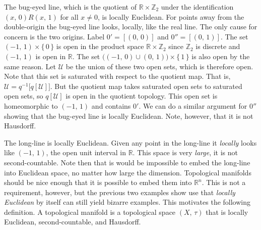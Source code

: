 \documentclass{article}
\theoremstyle{plain}
\theoremstyle{normal}
\newenvironment{example}{%
    \pushQED{\qed}\renewcommand{\qedsymbol}{$\blacksquare$}\examplex%
}{%
    \popQED\endexamplex%
}
\newenvironment{definition}{%
    \pushQED{\qed}\renewcommand{\qedsymbol}{$\blacksquare$}\definitionx%
}{%
    \popQED\enddefinitionx%
}
\begin{document}
        \begin{example}
            The bug-eyed line, which is the quotient of
            $\mathbb{R}\times\mathbb{Z}_{2}$ under the identification
            $(x,\,0)R(x,\,1)$ for all $x\ne{0}$, is locally Euclidean. For
            points away from the double-origin the bug-eyed line looks, locally,
            like the real line. The only cause for concern is the two origins.
            Label $0'=[(0,\,0)]$ and $0''=[(0,\,1)]$. The set
            $(-1,\,1)\times\{\,0\,\}$ is open in the product space
            $\mathbb{R}\times\mathbb{Z}_{2}$ since $\mathbb{Z}_{2}$ is discrete
            and $(-1,\,1)$ is open in $\mathbb{R}$. The set
            $\big((-1,\,0)\cup(0,\,1)\big)\times\{\,1\,\}$ is also open by the
            same reason. Let $\mathcal{U}$ be the union of these two open sets,
            which is therefore open. Note that this set is saturated with
            respect to the quotient map. That is,
            $\mathcal{U}=q^{-1}\big[q[\mathcal{U}]\big]$. But the quotient map
            takes saturated open sets to saturated open sets, so
            $q[\mathcal{U}]$ is open in the quotient topology. This open set
            is homeomorphic to $(-1,\,1)$ and contains $0'$. We can do a
            similar argument for $0''$ showing that the bug-eyed line is
            locally Euclidean. Note, however, that it is not Hausdorff.
        \end{example}
        \begin{example}
            The long-line is locally Euclidean. Given any point in the
            long-line it \textit{locally} looks like $(-1,\,1)$, the open
            unit interval in $\mathbb{R}$. This space is very \textit{large},
            it is not second-countable. Note then that is would be impossible
            to embed the long-line into Euclidean space, no matter how large
            the dimension.
        \end{example}
        Topological manifolds should be nice enough that it is possible to
        embed them into $\mathbb{R}^{n}$. This is not a requirement, however,
        but the previous two examples show use that \textit{locally Euclidean}
        by itself can still yield bizarre examples. This motivates the
        following definition.
        \begin{definition}[\textbf{Topological Manifold}]
            A topological manifold is a topological space $(X,\,\tau)$ that
            is locally Euclidean, second-countable, and Hausdorff.
        \end{definition}
\end{document}
